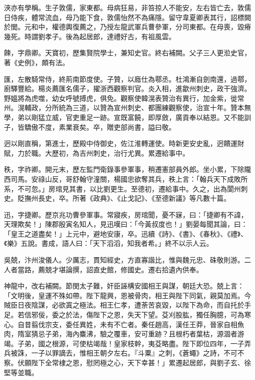 \begin{pinyinscope}
 浹亦有學稱。生子敦儒，家東都。母病狂易，非笞掠人不能安，左右皆亡去，敦儒日侍疾，體常流血，母乃能下食，敦儒怡然不為痛隱。留守韋夏卿表其行，詔標闕於閭。元和中，權德輿復薦之，乃授左龍武軍兵曹參軍，分司東都。在母喪，毀瘠幾死。時謂劉孝子。後為起居郎，達禮好古，有祖風雲。



 餗，字鼎卿。天寶初，歷集賢院學士，兼知史官。終右補闕。父子三人更涖史官，著《史例》，頗有法。



 匯，左散騎常侍，終荊南節度使。子贊，以廕仕為鄠丞。杜鴻漸自劍南還，過鄠，廚驛豐給。楊炎薦匯名儒子，擢浙西觀察判官。炎入相，進歙州刺史，政干強濟。野媼將為虎噬，幼女呼號搏虎，俱免。觀察使韓滉表贊治有異行，加金紫，徙常州。滉輔政，分所統為三道，以贊為宣州刺史、都團練觀察使，治宣十年。贊本無學，弟以剛猛立威，官吏重足一跡。宣既富饒，即厚斂，廣貢奉以結恩。又不能訓子，皆驕傲不度，素業衰矣。卒，贈吏部尚書，謚曰敬。



 迥以剛直稱，第進士，歷殿中侍御史，佐江淮轉運使。時新更安史亂，迥饋運財賦，力於職。大歷初，為吉州刺史，治行尤異。累遷給事中。



 秩，字祚卿。開元末，歷左監門衛錄事參軍事，稍遷憲部員外郎。坐小累，下除隴西司馬。安祿山反，哥舒翰守潼關，楊國忠欲奪其兵，秩上言：「翰兵天下成敗所系，不可忽。」房琯見其書，以比劉更生。至德初，遷給事中。久之，出為閬州刺史。貶撫州長史，卒。所著《政典》、《止戈記》、《至德新議》等凡數十篇。



 迅，字捷卿。歷京兆功曹參軍事。常寢疾，房琯聞，憂不寐，曰：「捷卿有不諱，天理欺矣！」陳郡殷寅名知人，見迅嘆曰：「今黃叔度也！」劉晏每聞其論，曰：「皇王之道盡矣！」上元中，避地安康，卒。迅續《詩》、《書》、《春秋》、《禮》、《樂》五說。書成，語人曰：「天下滔滔，知我者希。」終不以示人云。



 吳兢，汴州浚儀人。少厲志，貫知經史，方直寡諧比，惟與魏元忠、硃敬則游。二人者當路，薦兢才堪論撰，詔直史館，修國史。遷右拾遺內供奉。



 神龍中，改右補闕。節閔太子難，奸臣誣構安國相王與謀，朝廷大恐。兢上言：「文明後，皇運不殊如帶。陛下龍興，恩被骨肉，相王與陛下同氣，親莫加焉。今賊臣日夜陰謀，必欲寘之極法。相王仁孝，遭荼苦哀毀，以陛下為命，而自托於手足。若信邪佞，委之於法，傷陛下之恩，失天下望。芟刈股肱，獨任胸臆，可為寒心。自昔翦伐宗支，委任異姓，未有不亡者。秦任趙高，漢任王莽，晉家自相魚肉，隋室猜忌子弟，海內麋沸，驗之覆車，安可重跡？且根朽者葉枯，源涸者游竭。子弟，國之根源，可使枯竭哉！皇家枝幹，夷芟略盡。陛下即位四年，一子弄兵被誅，一子以罪謫去，惟相王朝夕左右。『斗粟』之刺，《蒼蠅》之詩，不可不察。伏願陛下全常棣之恩，慰罔極之心，天下幸甚！」累遷起居郎，與劉子玄、徐堅等並職。




\end{pinyinscope}
